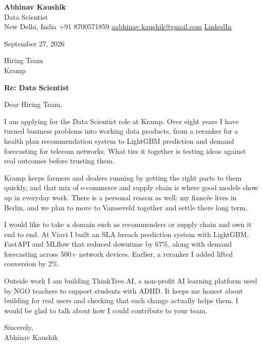 \documentclass[11pt,a4paper]{article}
\begin{document}
{\Large\bfseries Abhinav Kaushik}\\
Data Scientist\\
New Delhi, India \textbar{} +91 8700571859 \textbar{} \href{mailto:aabhinav.kaushik@gmail.com}{aabhinav.kaushik@gmail.com} \textbar{} \href{https://www.linkedin.com/in/abhinav-kaushik10/}{LinkedIn}  

September 27, 2026

Hiring Team\\
Kramp

\textbf{Re: Data Scientist}

Dear Hiring Team,

I am applying for the Data Scientist role at Kramp. Over eight years I have turned business problems into working data products, from a reranker for a health plan recommendation system to LightGBM prediction and demand forecasting for telecom networks. What ties it together is testing ideas against real outcomes before trusting them.

Kramp keeps farmers and dealers running by getting the right parts to them quickly, and that mix of e-commerce and supply chain is where good models show up in everyday work. There is a personal reason as well: my fiancée lives in Berlin, and we plan to move to Varsseveld together and settle there long term.

I would like to take a domain such as recommenders or supply chain and own it end to end. At Viavi I built an SLA breach prediction system with LightGBM, FastAPI and MLflow that reduced downtime by 67\%, along with demand forecasting across 500+ network devices. Earlier, a reranker I added lifted conversion by 2\%.

Outside work I am building ThinkTree.AI, a non-profit AI learning platform used by NGO teachers to support students with ADHD. It keeps me honest about building for real users and checking that each change actually helps them. I would be glad to talk about how I could contribute to your team.

Sincerely,\\[4pt]
Abhinav Kaushik
\end{document}
